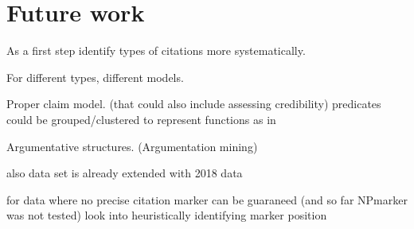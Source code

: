 \chapter{Future work}
As a first step identify types of citations more systematically.

For different types, different models.

Proper claim model. (that could also include assessing credibility\cite{Popat2016})
predicates could be grouped/clustered to represent functions as in \cite{Gabor2018}

Argumentative structures. (Argumentation mining\cite{Stab2016,Lippi2016,Habernal2017})

also data set is already extended with 2018 data

for data where no precise citation marker can be guaraneed (and so far NPmarker was not tested) look into heuristically identifying marker position
